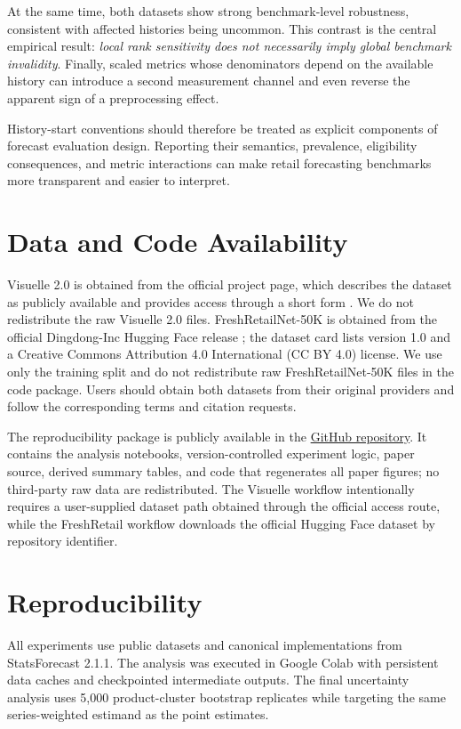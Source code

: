 At the same time, both datasets show strong benchmark-level robustness, consistent with affected histories being uncommon. This contrast is the central empirical result: \emph{local rank sensitivity does not necessarily imply global benchmark invalidity}. Finally, scaled metrics whose denominators depend on the available history can introduce a second measurement channel and even reverse the apparent sign of a preprocessing effect.

History-start conventions should therefore be treated as explicit components of forecast evaluation design. Reporting their semantics, prevalence, eligibility consequences, and metric interactions can make retail forecasting benchmarks more transparent and easier to interpret.

\section*{Data and Code Availability}

Visuelle 2.0 is obtained from the official project page, which describes the dataset as publicly available and provides access through a short form \citep{visuelle_dataset_page}. We do not redistribute the raw Visuelle 2.0 files. FreshRetailNet-50K is obtained from the official Dingdong-Inc Hugging Face release \citep{freshretail_dataset_card}; the dataset card lists version 1.0 and a Creative Commons Attribution 4.0 International (CC BY 4.0) license. We use only the training split and do not redistribute raw FreshRetailNet-50K files in the code package. Users should obtain both datasets from their original providers and follow the corresponding terms and citation requests.

The reproducibility package is publicly available in the \href{https://github.com/hjy075/history-start-sensitivity}{GitHub repository}. It contains the analysis notebooks, version-controlled experiment logic, paper source, derived summary tables, and code that regenerates all paper figures; no third-party raw data are redistributed. The Visuelle workflow intentionally requires a user-supplied dataset path obtained through the official access route, while the FreshRetail workflow downloads the official Hugging Face dataset by repository identifier.

\section*{Reproducibility}

All experiments use public datasets and canonical implementations from StatsForecast 2.1.1. The analysis was executed in Google Colab with persistent data caches and checkpointed intermediate outputs. The final uncertainty analysis uses 5,000 product-cluster bootstrap replicates while targeting the same series-weighted estimand as the point estimates.

